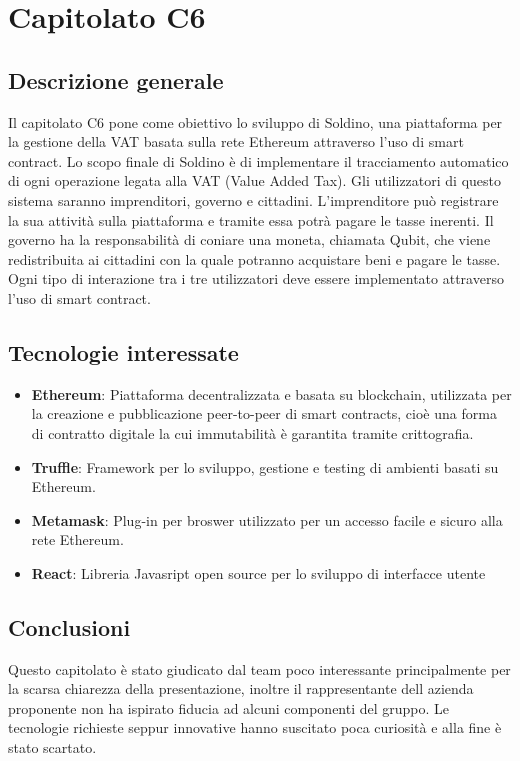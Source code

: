\documentclass[11pt,a4paper]{article}
\begin{document}
\section{Capitolato C6}
\subsection{Descrizione generale}
Il capitolato C6 pone come obiettivo lo sviluppo di Soldino, una piattaforma per la gestione della
VAT basata sulla rete Ethereum attraverso l'uso di smart contract.
Lo scopo finale di Soldino è di implementare il tracciamento automatico di ogni operazione legata
alla VAT (Value Added Tax).
Gli utilizzatori di questo sistema saranno imprenditori, governo e cittadini. L'imprenditore può
registrare la sua attività sulla piattaforma e tramite essa potrà pagare le tasse inerenti. Il governo ha la responsabilità di coniare una moneta, chiamata Qubit, che viene
redistribuita ai cittadini con la quale potranno acquistare beni e pagare le tasse. Ogni tipo di
interazione tra i tre utilizzatori deve essere implementato attraverso l'uso di smart contract.
\subsection{Tecnologie interessate}
\begin{itemize}
\item \textbf{Ethereum}: Piattaforma decentralizzata e basata su blockchain, utilizzata per la creazione e pubblicazione peer-to-peer di smart contracts, cioè una forma di contratto digitale la cui immutabilità è garantita tramite crittografia.
\item \textbf{Truffle}: Framework per lo sviluppo, gestione e testing di ambienti basati su Ethereum.
\item \textbf{Metamask}: Plug-in per broswer utilizzato per un accesso facile e sicuro alla rete Ethereum.
\item \textbf{React}: Libreria Javasript open source per lo sviluppo di interfacce utente
\end{itemize}
\subsection{Conclusioni}
Questo capitolato è stato giudicato dal team poco interessante principalmente per la scarsa chiarezza della presentazione, inoltre il rappresentante dell azienda proponente non ha ispirato fiducia ad alcuni componenti del gruppo. Le tecnologie richieste seppur innovative hanno suscitato poca curiosità e alla fine è stato scartato.
	
\end{document}
